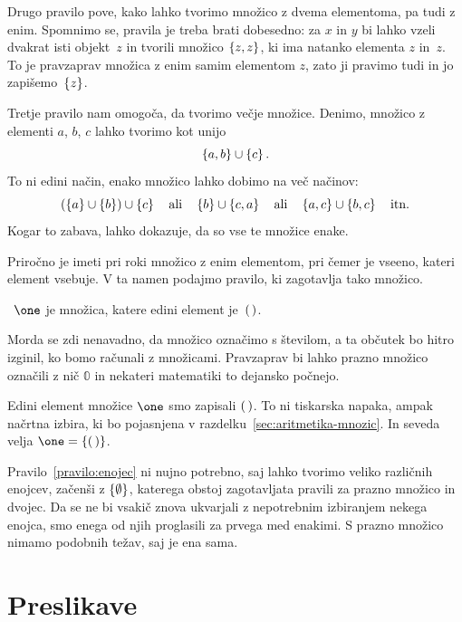 Drugo pravilo pove, kako lahko tvorimo množico z dvema elementoma, pa tudi z enim.
Spomnimo se, pravila je treba brati dobesedno: za $x$ in $y$ bi lahko vzeli dvakrat isti
objekt~$z$ in tvorili množico $\left\{z, z\right\}$, ki ima natanko elementa $z$ in~$z$. To je
pravzaprav množica z enim samim elementom $z$, zato ji pravimo tudi  in jo
zapišemo~$\left\{z\right\}$.

Tretje pravilo nam omogoča, da tvorimo večje množice. Denimo, množico z elementi $a$, $b$,
$c$ lahko tvorimo kot unijo
%
\begin{equation*}
  \left\{a, b\right\} \cup \left\{c\right\}.
\end{equation*}
%
To ni edini način, enako množico lahko dobimo na več načinov:
%
\begin{equation*}
  (\left\{a\right\} \cup \left\{b\right\}) \cup \left\{c\right\}
  \quad\text{ali}\quad
  \left\{b\right\} \cup \left\{c, a\right\}
  \quad\text{ali}\quad
  \left\{a,c\right\} \cup \left\{b,c\right\}
  \quad\text{itn.}
\end{equation*}
%
Kogar to zabava, lahko dokazuje, da so vse te množice enake.

Priročno je imeti pri roki množico z enim elementom, pri čemer je vseeno, kateri element vsebuje.
%
V ta namen podajmo pravilo, ki zagotavlja tako množico.

\begin{pravilo}
  \label{pravilo:enojec}
  ~$\one$ je množica, katere edini element je~$(\,)$.
\end{pravilo}

Morda se zdi nenavadno, da množico označimo s številom, a ta občutek bo hitro izginil, ko
bomo računali z množicami. Pravzaprav bi lahko prazno množico označili z nič $\mathbb{0}$
in nekateri matematiki to dejansko počnejo.

Edini element množice $\one$ smo zapisali $(\,)$. To ni tiskarska napaka,
ampak načrtna izbira, ki bo pojasnjena v razdelku~\ref{sec:aritmetika-mnozic}.
In seveda velja $\one = \set{\unit}$.

Pravilo~\ref{pravilo:enojec} ni nujno potrebno, saj lahko tvorimo veliko različnih enojcev,
začenši z $\left\{\emptyset\right\}$, katerega obstoj zagotavljata pravili za prazno množico in dvojec.
Da se ne bi vsakič znova ukvarjali z nepotrebnim izbiranjem nekega enojca, smo enega od njih
proglasili za prvega med enakimi. S prazno množico nimamo podobnih težav, saj je ena sama.

\section{Preslikave}
\label{sec:preslikave}

